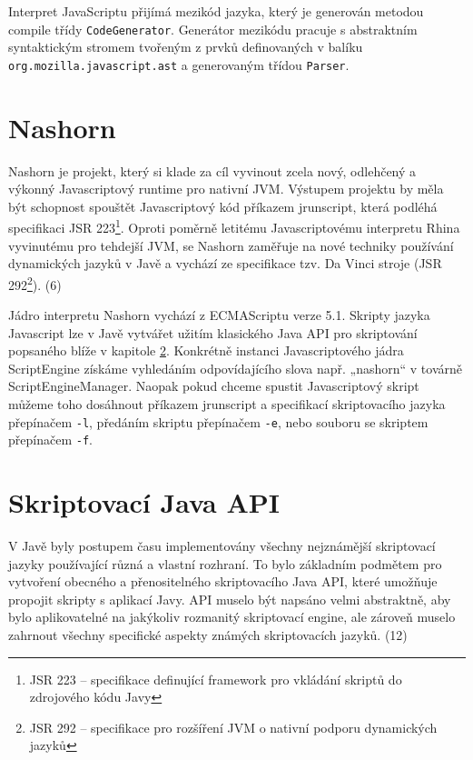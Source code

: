 Interpret JavaScriptu přijímá mezikód jazyka, který je generován metodou compile třídy \texttt{CodeGenerator}. Generátor mezikódu pracuje s abstraktním syntaktickým stromem tvořeným z prvků definovaných v balíku \texttt{org.mozilla.javascript.ast} a generovaným třídou \texttt{Parser}.

\section{Nashorn}
\label{Chapter.JavaScriptInJavaAnalysis.Nashorn}

Nashorn je projekt, který si klade za cíl vyvinout zcela nový, odlehčený a výkonný Javascriptový runtime pro nativní JVM. Výstupem projektu by měla být schopnost spouštět Javascriptový kód příkazem jrunscript, která podléhá specifikaci JSR 223\footnote{JSR 223 -- specifikace definující framework pro vkládání skriptů do zdrojového kódu Javy}. Oproti poměrně letitému Javascriptovému interpretu Rhina vyvinutému pro tehdejší JVM, se Nashorn zaměřuje na nové techniky používání dynamických jazyků v Javě a vychází ze specifikace tzv. Da Vinci stroje (JSR 292\footnote{JSR 292 -- specifikace pro rozšíření JVM o nativní podporu dynamických jazyků}). (6)

Jádro interpretu Nashorn vychází z ECMAScriptu verze 5.1. Skripty jazyka Javascript lze v Javě vytvářet užitím klasického Java API pro skriptování popsaného blíže v kapitole \ref{Chapter.JavaScriptInJavaAnalysis.ScriptingJavaAPI}. Konkrétně instanci Javascriptového jádra ScriptEngine získáme vyhledáním odpovídajícího slova např. „nashorn“ v továrně ScriptEngineManager. Naopak pokud chceme spustit Javascriptový skript můžeme toho dosáhnout příkazem jrunscript a specifikací skriptovacího jazyka přepínačem \texttt{-l}, předáním skriptu přepínačem \texttt{-e}, nebo souboru se skriptem přepínačem \texttt{-f}.

\section{Skriptovací Java API}
\label{Chapter.JavaScriptInJavaAnalysis.ScriptingJavaAPI}

V Javě byly postupem času implementovány všechny nejznámější skriptovací jazyky používající různá a vlastní rozhraní. To bylo základním podmětem pro vytvoření obecného a přenositelného skriptovacího Java API, které umožňuje propojit skripty s aplikací Javy. API muselo být napsáno velmi abstraktně, aby bylo aplikovatelné na jakýkoliv rozmanitý skriptovací engine, ale zároveň muselo zahrnout všechny specifické aspekty známých skriptovacích jazyků. (12)

